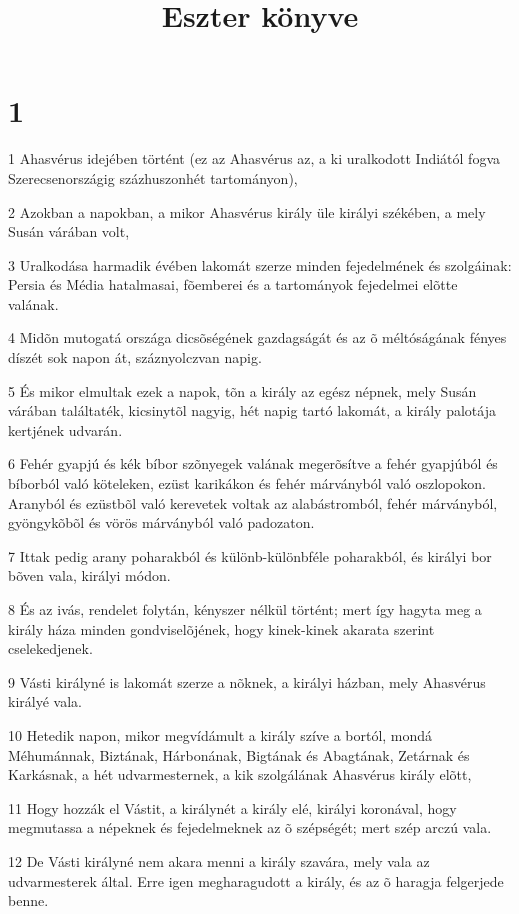 

\title{Eszter könyve}


\chapter{1}

\par 1 Ahasvérus idejében történt (ez az Ahasvérus az, a ki uralkodott Indiától fogva Szerecsenországig százhuszonhét tartományon),
\par 2 Azokban a napokban, a mikor Ahasvérus király üle királyi székében, a mely Susán várában volt,
\par 3 Uralkodása harmadik évében lakomát szerze minden fejedelmének és szolgáinak: Persia és Média hatalmasai, fõemberei és a tartományok fejedelmei elõtte valának.
\par 4 Midõn mutogatá országa dicsõségének gazdagságát és az õ méltóságának fényes díszét sok napon át, száznyolczvan napig.
\par 5 És mikor elmultak ezek a napok, tõn a király az egész népnek, mely Susán várában találtaték, kicsinytõl nagyig, hét napig tartó lakomát, a király palotája kertjének udvarán.
\par 6 Fehér gyapjú és kék bíbor szõnyegek valának megerõsítve a fehér gyapjúból és bíborból való köteleken, ezüst karikákon és fehér márványból való oszlopokon. Aranyból és ezüstbõl való kerevetek voltak az alabástromból, fehér márványból, gyöngykõbõl és vörös márványból való padozaton.
\par 7 Ittak pedig arany poharakból és különb-különbféle poharakból, és királyi bor bõven vala, királyi módon.
\par 8 És az ivás, rendelet folytán, kényszer nélkül történt; mert így hagyta meg a király háza minden gondviselõjének, hogy kinek-kinek akarata szerint cselekedjenek.
\par 9 Vásti királyné is lakomát szerze a nõknek, a királyi házban, mely Ahasvérus királyé vala.
\par 10 Hetedik napon, mikor megvídámult a király szíve a bortól, mondá Méhumánnak, Biztának, Hárbonának, Bigtának és Abagtának, Zetárnak és Karkásnak, a hét udvarmesternek, a kik szolgálának Ahasvérus király elõtt,
\par 11 Hogy hozzák el Vástit, a királynét a király elé, királyi koronával, hogy megmutassa a népeknek és fejedelmeknek az õ szépségét; mert szép arczú vala.
\par 12 De Vásti királyné nem akara menni a király szavára, mely vala az udvarmesterek által. Erre igen megharagudott a király, és az õ haragja felgerjede benne.
